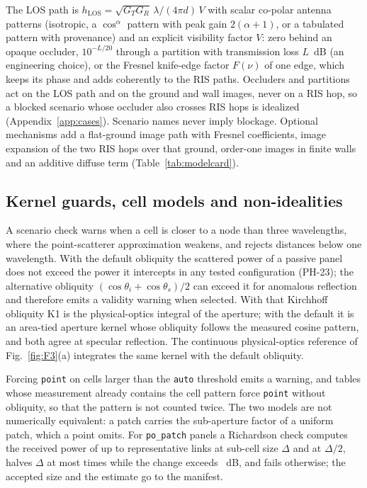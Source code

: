 The LOS path is $h_{\mathrm{LOS}}=\sqrt{G_TG_R}\,
\lambda/(4\pi d)\,V$ with scalar co-polar antenna patterns (isotropic, a $\cos^\alpha$
pattern with peak gain $2(\alpha+1)$, or a tabulated pattern with provenance) and an explicit
visibility factor $V$: zero behind an opaque occluder, $10^{-L/20}$ through a partition with
transmission loss $L$~dB (an engineering choice), or the Fresnel knife-edge factor $F(\nu)$
of one edge, which keeps its phase and adds coherently to the RIS paths. Occluders and
partitions act on the LOS path and on the ground and wall images, never on a RIS hop, so a
blocked scenario whose occluder also crosses RIS hops is idealized (Appendix~\ref{app:cases}).
Scenario names never imply blockage. Optional mechanisms add a flat-ground image path with Fresnel
coefficients, image expansion of the two RIS hops over that ground, order-one images in
finite walls and an additive diffuse term (Table~\ref{tab:modelcard}).

\subsection{Kernel guards, cell models and non-idealities}
A scenario check warns when a cell is closer to a node than
three wavelengths, where the point-scatterer approximation weakens, and rejects distances
below one wavelength. With the default obliquity the scattered power of a passive panel does
not exceed the power it intercepts in any tested configuration (PH-23); the alternative obliquity
$(\cos\theta_i+\cos\theta_s)/2$ can exceed it for anomalous reflection and therefore
emits a validity warning when selected. With that Kirchhoff obliquity K1 is the
physical-optics integral of the aperture; with the default it is an area-tied aperture kernel
whose obliquity follows the measured cosine pattern, and both agree at specular reflection.
The continuous physical-optics reference of Fig.~\ref{fig:F3}(a) integrates the same kernel
with the default obliquity.

Forcing \texttt{point} on cells larger than the \texttt{auto} threshold
emits a warning, and tables whose measurement already contains the cell pattern force
\texttt{point} without obliquity, so that the pattern is not counted twice. The two models are
not numerically equivalent: a patch carries the sub-aperture factor of a uniform patch, which a
point omits. For \texttt{po\_patch}
panels a Richardson check computes the received power of up to \numRichardsonLinks{}
representative links at sub-cell size $\Delta$ and at $\Delta/2$, halves $\Delta$ at most
\numRichardsonHalvings{} times while the change exceeds \numRichardsonTolDb~dB, and fails
otherwise; the accepted size and the estimate go to the manifest.

